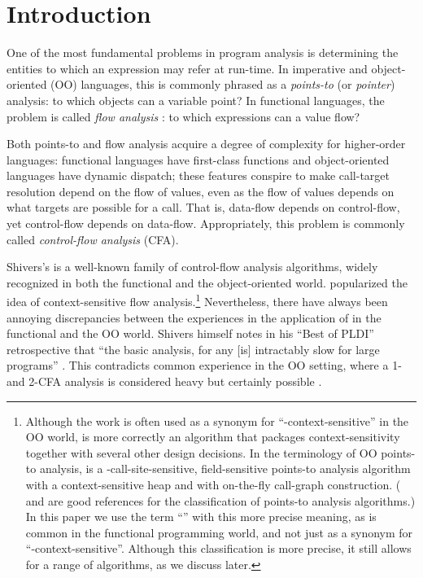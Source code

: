








\section{Introduction}

One of the most fundamental problems in program analysis is
determining the entities to which an expression may refer at
run-time.  In imperative and object-oriented (OO) languages, this is
commonly phrased as a \emph{points-to} (or \emph{pointer}) analysis:
to which objects can a variable point? In functional languages, the
problem is called \emph{flow analysis} \cite{dvanhorn:Midtgaard2011Controlflow}:
to which expressions can a value flow?

Both points-to and flow analysis acquire a degree of complexity for
higher-order languages: functional languages have
first-class functions and object-oriented languages have dynamic
dispatch; these features conspire to make call-target resolution
depend on the flow of values, even as the flow of values depends on
what targets are possible for a call.
That is, data-flow depends on control-flow, yet control-flow depends on
data-flow.
Appropriately, this problem is commonly called
\emph{control-flow analysis} (CFA).

Shivers's \kCFA{} \cite{mattmight:Shivers:1991:CFA} is a
well-known family of control-flow analysis algorithms, widely
recognized in both the functional and the object-oriented
world. \kCFA{} popularized the  idea of context-sensitive
flow analysis.\footnote{Although the \kCFA{} work is often used as a
  synonym for ``-context-sensitive'' in the OO world, \kCFA{} is more
  correctly an algorithm that packages context-sensitivity together
  with several other design decisions. In the terminology of OO
  points-to analysis, \kCFA{} is a -call-site-sensitive,
  field-sensitive points-to analysis algorithm with a
  context-sensitive heap and with on-the-fly call-graph
  construction. (\citet{Lhotak:2006:PAU} and \citet{1391987} are good
  references for the classification of points-to analysis algorithms.)
  In this paper we use the term ``\kCFA'' with this more precise meaning,
  as is common in the functional programming world, and not just as a
  synonym for ``-context-sensitive''. Although this classification 
  is more precise, it still allows for a range of algorithms, as we
  discuss later.} Nevertheless, there have
always been annoying discrepancies between the experiences in the
application of \kCFA{} in the functional and the OO world. Shivers
himself notes in his ``Best of PLDI'' retrospective that ``the basic
analysis, for any  [is] intractably slow for large programs''
\cite{dvanhorn:shivers-sigplan04}.
This contradicts common experience in the OO setting, where a 1- and
2-CFA analysis is considered heavy but certainly possible
\cite{1391987,BS-OOPSLA09}. 

